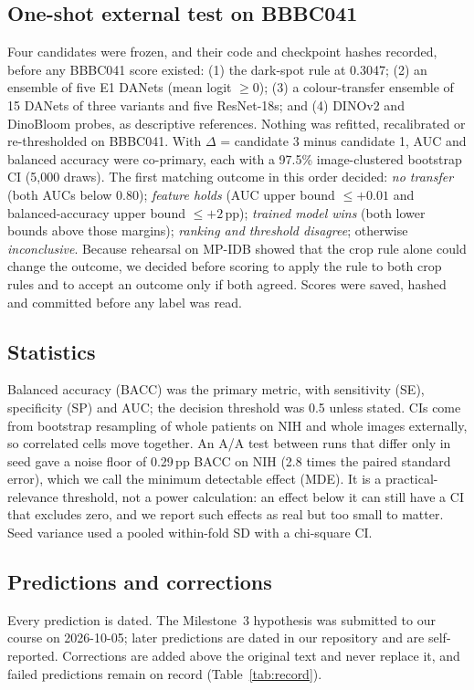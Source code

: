 \documentclass[conference]{IEEEtran}
\newcommand{\pp}{\,pp}
\begin{document}
\subsection{One-shot external test on BBBC041}
\label{sec:protocol}
Four candidates were frozen, and their code and checkpoint hashes recorded, before any BBBC041 score existed: (1) the dark-spot rule at 0.3047; (2) an ensemble of five E1 DANets (mean logit $\geq 0$); (3) a colour-transfer ensemble of 15 DANets of three variants and five ResNet-18s; and (4) DINOv2 and DinoBloom probes, as descriptive references. Nothing was refitted, recalibrated or re-thresholded on BBBC041. With $\Delta$ = candidate 3 minus candidate 1, AUC and balanced accuracy were co-primary, each with a 97.5\% image-clustered bootstrap CI (5{,}000 draws). The first matching outcome in this order decided: \emph{no transfer} (both AUCs below 0.80); \emph{feature holds} (AUC upper bound $\le +0.01$ and balanced-accuracy upper bound $\le +2$\pp); \emph{trained model wins} (both lower bounds above those margins); \emph{ranking and threshold disagree}; otherwise \emph{inconclusive}. Because rehearsal on MP-IDB showed that the crop rule alone could change the outcome, we decided before scoring to apply the rule to both crop rules and to accept an outcome only if both agreed. Scores were saved, hashed and committed before any label was read.

\subsection{Statistics}
Balanced accuracy (BACC) was the primary metric, with sensitivity (SE), specificity (SP) and AUC; the decision threshold was 0.5 unless stated. CIs come from bootstrap resampling of whole patients on NIH and whole images externally, so correlated cells move together. An A/A test between runs that differ only in seed gave a noise floor of 0.29\pp{} BACC on NIH (2.8 times the paired standard error), which we call the minimum detectable effect (MDE). It is a practical-relevance threshold, not a power calculation: an effect below it can still have a CI that excludes zero, and we report such effects as real but too small to matter. Seed variance used a pooled within-fold SD with a chi-square CI.

\subsection{Predictions and corrections}
Every prediction is dated. The Milestone~3 hypothesis was submitted to our course on 2026-10-05; later predictions are dated in our repository and are self-reported. Corrections are added above the original text and never replace it, and failed predictions remain on record (Table~\ref{tab:record}).
\end{document}
